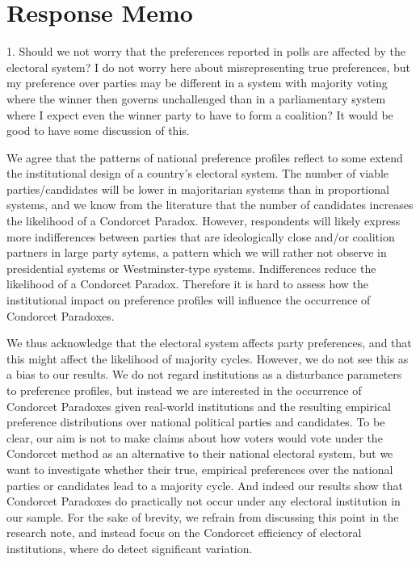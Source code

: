 \documentclass[a4paper, 12pt]{scrartcl}
\theoremstyle{break}
\newenvironment{changes}{\par\color{violet}\par\addvspace{\baselineskip}}{\par\addvspace{\baselineskip}}
\begin{document}
\section*{Response Memo} 
\begin{changes}
1. Should we not worry that the preferences reported in polls are affected by the electoral system? I do not worry here about misrepresenting true preferences, but my preference over parties may be different in a system with majority voting where the winner then governs unchallenged than in a parliamentary system where I expect even the winner party to have to form a coalition? It would be good to have some discussion of this.
\end{changes}

We agree that the patterns of national preference profiles reflect to some extend the institutional design of a country's electoral system. The number of viable parties/candidates will be lower in majoritarian systems than in proportional systems, and we know from the literature that the number of candidates increases the likelihood of a Condorcet Paradox. However, respondents will likely express more indifferences between parties that are ideologically close and/or coalition partners in large party sytems, a pattern which we will rather not observe in presidential systems or Westminster-type systems. Indifferences reduce the likelihood of a Condorcet Paradox. Therefore it is hard to assess how the institutional impact on preference profiles will influence the occurrence of Condorcet Paradoxes. 

We thus acknowledge that the electoral system affects party preferences, and that this might affect the likelihood of majority cycles. However, we do not see this as a bias to our results. We do not regard institutions as a disturbance parameters to  preference profiles, but  instead we are interested in the occurrence of Condorcet Paradoxes given real-world institutions and the resulting empirical preference distributions over national political parties and candidates. To be clear, our aim is not to make claims about how voters would vote under the Condorcet method as an alternative to their national electoral system, but we want to investigate whether their true, empirical preferences over the national parties or candidates lead to a majority cycle. And indeed our results show that Condorcet Paradoxes do practically not occur under any electoral institution in our sample. For the sake of brevity, we refrain from discussing this point in the research note, and instead focus on the Condorcet efficiency of electoral institutions, where do detect significant variation.
\end{document}
